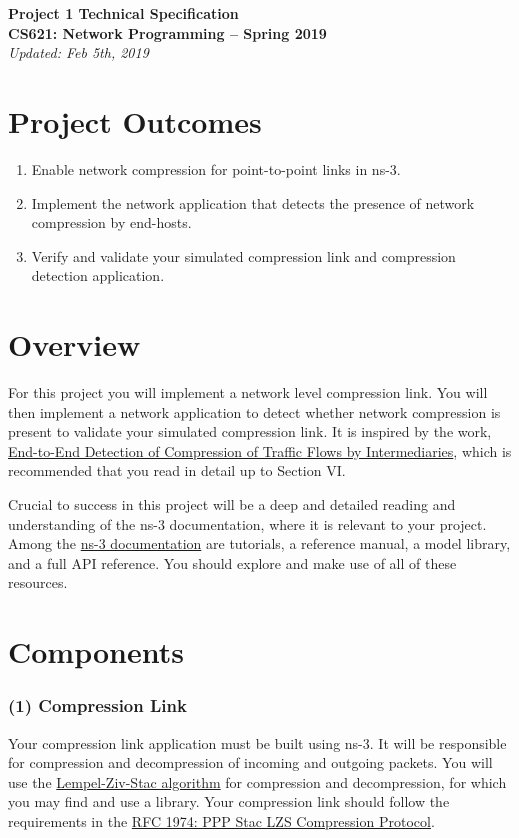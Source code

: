 \documentclass[10pt]{article}
\begin{document}
\Large
{\bf Project 1 Technical Specification}\\
{\bf \noindent CS621: Network Programming -- Spring 2019}\\
\noindent \emph{Updated: Feb 5th, 2019}\\

\normalsize
\setcounter{secnumdepth}{0}
\section{Project Outcomes}
\begin{enumerate}
    \item Enable network compression for point-to-point links in ns-3.
    \item Implement the network application that detects the presence of network compression by end-hosts.
    \item Verify and validate your simulated compression link and compression detection application.
\end{enumerate}

\section{Overview}
For this project you will implement a network level compression link. You will then implement a network application to detect whether network compression is present to validate your simulated compression link. It is inspired by the work, \href{https://lasr.cs.ucla.edu/vahab/resources/compression_detection.pdf}{End-to-End Detection of Compression of Traffic Flows by Intermediaries}, which is recommended that you read in detail up to Section VI.

Crucial to success in this project will be a deep and detailed reading and understanding of the ns-3 documentation, where it is relevant to your project. Among the \href{https://www.nsnam.org/releases/ns-3-29/documentation/}{ns-3 documentation} are tutorials, a reference manual, a model library, and a full API reference.  You should explore and make use of all of these resources.

\section{Components}
\subsubsection{(1) Compression Link}
Your compression link application must be built using ns-3. It will be responsible for compression and decompression of incoming and outgoing packets. You will use the \href{https://en.wikipedia.org/wiki/Lempel\%E2\%80\%93Ziv\%E2\%80\%93Stac}{Lempel-Ziv-Stac algorithm} for compression and decompression, for which you may find and use a library.  Your compression link should follow the requirements in the \href{http://www.rfcreader.com/#rfc1974}{RFC 1974: PPP Stac LZS Compression Protocol}.
\end{document}
